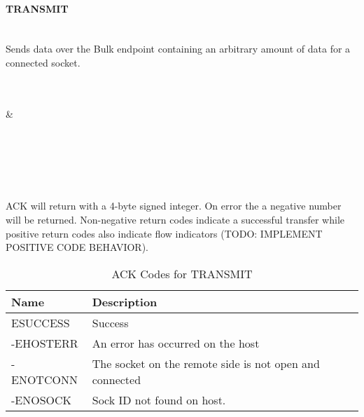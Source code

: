 \documentclass[10pt]{article}
\begin{document}
	\paragraph{TRANSMIT} \mbox{}\\
	Sends data over the Bulk endpoint containing an arbitrary amount of data for a connected socket.\\
	\\
	\begin{bytefield}[bitwidth=1.7em]{32}
		 \\
			 &
			 \\
			 \\
			 \\
			 \\
	\end{bytefield}\\
	\\
	ACK will return with a 4-byte signed integer. On error the a negative number will be returned. Non-negative return codes indicate a successful transfer while positive return codes also indicate flow indicators (TODO: IMPLEMENT POSITIVE CODE BEHAVIOR).\\
	\begin{table}[H]
		\begin{center}
			\caption{ACK Codes for TRANSMIT}
			\label{tab:transmitErrTable}
			\begin{tabular}{l|l} 
				\rowcolor{lightgray}
				\textbf{Name} & \textbf{Description}\\
				\hline
				ESUCCESS & Success\\
				-EHOSTERR & An error has occurred on the host\\
				-ENOTCONN & The socket on the remote side is not open and connected\\
				-ENOSOCK & Sock ID not found on host. \\
			\end{tabular}
		\end{center}
	\end{table} \mbox{}\\
\end{document}
